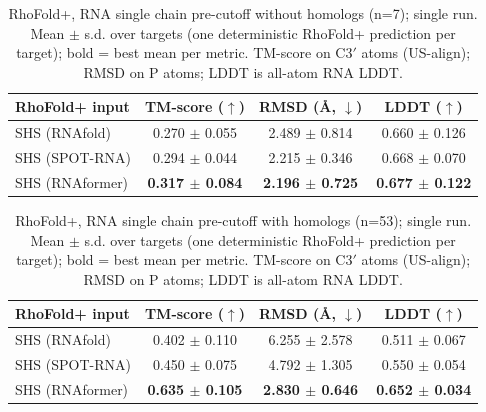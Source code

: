 \begin{table}[htbp]
\centering
\caption{RhoFold+, RNA single chain pre-cutoff without homologs (n=7); single run. Mean $\pm$ s.d. over targets (one deterministic RhoFold+ prediction per target); bold = best mean per metric. TM-score on C3$'$ atoms (US-align); RMSD on P atoms; LDDT is all-atom RNA LDDT.}
\label{tab:rf_rna_single_chain_pre_cutoff_without_homologs}
\begin{tabular}{lccc}
\toprule
RhoFold+ input & TM-score ($\uparrow$) & RMSD (\AA, $\downarrow$) & LDDT ($\uparrow$) \\
\midrule
SHS (RNAfold) & 0.270 $\pm$ 0.055 & 2.489 $\pm$ 0.814 & 0.660 $\pm$ 0.126 \\
SHS (SPOT-RNA) & 0.294 $\pm$ 0.044 & 2.215 $\pm$ 0.346 & 0.668 $\pm$ 0.070 \\
SHS (RNAformer) & \textbf{0.317 $\pm$ 0.084} & \textbf{2.196 $\pm$ 0.725} & \textbf{0.677 $\pm$ 0.122} \\
\bottomrule
\end{tabular}
\end{table}

\begin{table}[htbp]
\centering
\caption{RhoFold+, RNA single chain pre-cutoff with homologs (n=53); single run. Mean $\pm$ s.d. over targets (one deterministic RhoFold+ prediction per target); bold = best mean per metric. TM-score on C3$'$ atoms (US-align); RMSD on P atoms; LDDT is all-atom RNA LDDT.}
\label{tab:rf_rna_single_chain_pre_cutoff_with_homologs}
\begin{tabular}{lccc}
\toprule
RhoFold+ input & TM-score ($\uparrow$) & RMSD (\AA, $\downarrow$) & LDDT ($\uparrow$) \\
\midrule
SHS (RNAfold) & 0.402 $\pm$ 0.110 & 6.255 $\pm$ 2.578 & 0.511 $\pm$ 0.067 \\
SHS (SPOT-RNA) & 0.450 $\pm$ 0.075 & 4.792 $\pm$ 1.305 & 0.550 $\pm$ 0.054 \\
SHS (RNAformer) & \textbf{0.635 $\pm$ 0.105} & \textbf{2.830 $\pm$ 0.646} & \textbf{0.652 $\pm$ 0.034} \\
\bottomrule
\end{tabular}
\end{table}

